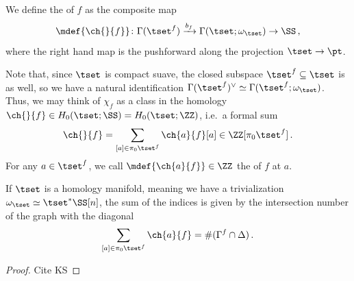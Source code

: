 \begin{defn}
  We define the  of $f$ as the composite map
  \[ \mdef{\ch{}{f}}\colon \Gamma(\tset^f)\xrightarrow{b_f} \Gamma(\tset;\omega_\tset) \to \SS\,,\]
  where the right hand map is the pushforward along the projection $\tset \to \pt$.
\end{defn}

Note that, since $\tset$ is compact suave, the closed subspace $\tset^f\subseteq \tset$ is as
well, so we have a natural identification $\Gamma(\tset^f)^{\vee}\simeq \Gamma(\tset^f;\omega_{\tset})$. Thus, we may think of $\chi_f$ as a class in the homology
$\ch{}{f} \in H_0(\tset;\SS)= H_0(\tset;\ZZ)$, i.e.~a formal sum
\[ \ch{}{f} = \sum_{[a]\in \pi_0\tset^f} \ch{a}{f}[a] \in \ZZ[\pi_0 \tset^f]\,.\]
For any $a\in \tset^f$, we call $\mdef{\ch{a}{f}} \in \ZZ$ the  of $f$ at $a$.

\begin{lem}
  If $\tset$ is a homology manifold, meaning we have a trivialization
  $\omega_{\tset} \simeq \tset^{\ast}\SS[n]$, the sum of the indices
  is given by the intersection number of the graph with the diagonal
  \[ \sum_{[a]\in \pi_0 \tset^f} \ch{a}{f} = \#(\Gamma^f\cap \Delta)\,.\]
\end{lem}
\begin{proof}
  Cite KS
\end{proof}


